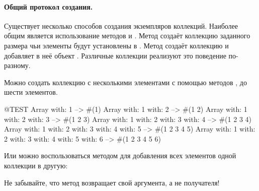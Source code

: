 \documentclass[a4paper,10pt,twoside]{book}
\begin{document}
\paragraph{Общий протокол создания.}
Существует несколько способов создания экземпляров коллекций. Наиболее общим является использование методов  и . Метод  создаёт коллекцию заданного размера чьи элементы будут установлены в . Метод   создаёт коллекцию и добавляет в неё объект . Различные коллекции реализуют это поведение по-разному.

Можно создать коллекцию с несколькими элементами с помощью методов ,  \etc до шести элементов.

\begin{code}{@TEST}
Array with: 1 --> #(1)
Array with: 1 with: 2 --> #(1 2)
Array with: 1 with: 2 with: 3 --> #(1 2 3)
Array with: 1 with: 2 with: 3 with: 4 --> #(1 2 3 4)
Array with: 1 with: 2 with: 3 with: 4 with: 5 --> #(1 2 3 4 5)
Array with: 1 with: 2 with: 3 with: 4 with: 5 with: 6 --> #(1 2 3 4 5 6)
\end{code}

Или можно воспользоваться методом  для добавления всех элементов одной коллекции в другую:

\noindent
Не забывайте, что метод  возвращает свой аргумента, а не получателя!
\end{document}
